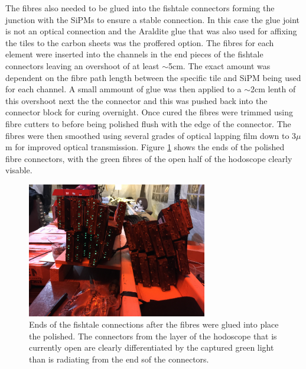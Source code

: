 The fibres also needed to be glued into the fishtale connectors forming the junction with the SiPMs to ensure a stable connection. In this case the glue joint is not an optical connection and the Araldite glue that was also used for affixing the tiles to the carbon sheets was the proffered option. The fibres for each element were inserted into the channels in the end pieces of the fishtale connectors leaving an overshoot of at least $\sim$5cm. The exact amount was dependent on the fibre path length between the specific tile and SiPM being used for each channel. A small ammount of glue was then applied to a $\sim$2cm lenth of this overshoot next the the connector and this was pushed back into the connector block for curing overnight. Once cured the fibres were trimmed using fibre cutters to before being polished flush with the edge of the connector. The fibres were then smoothed using several grades of optical lapping film down to 3$\mu$m for improved optical transmission. Figure \ref{postgluefishtale} shows the ends of the polished fibre connectors, with the green fibres of the open half of the hodoscope clearly visable. 

\begin{figure}
	\centering
	\includegraphics[width=0.7\textwidth]{ImgChap1/postgluefishtale}
	\caption{Ends of the fishtale connections after the fibres were glued into place the polished. The connectors from the layer of the hodoscope that is currently open are clearly differentiated by the captured green light than is radiating from the end sof the connectors.}		
	\label{postgluefishtale}
\end{figure}



			
%
%
%

